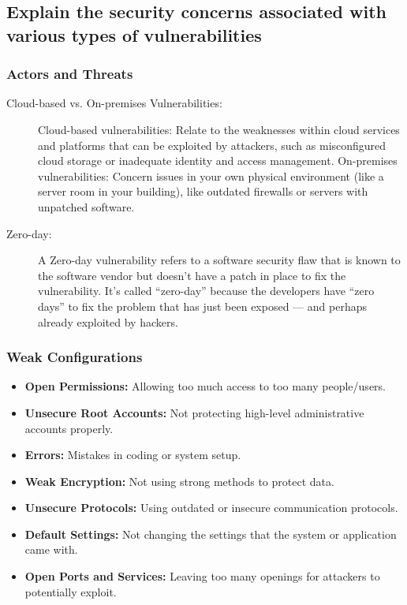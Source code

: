 \begin{fullwidth} 
    \subsection{Explain the security concerns associated with various types of vulnerabilities}
    \subsubsection*{\color{red}Actors and Threats}
    \begin{description}
        \item[Cloud-based vs. On-premises Vulnerabilities:] Cloud-based vulnerabilities: Relate to the weaknesses within cloud services and platforms that can be exploited by attackers, such as misconfigured cloud storage or inadequate identity and access management. On-premises vulnerabilities: Concern issues in your own physical environment (like a server room in your building), like outdated firewalls or servers with unpatched software.
        \item[Zero-day:] A Zero-day vulnerability refers to a software security flaw that is known to the software vendor but doesn’t have a patch in place to fix the vulnerability. It’s called “zero-day” because the developers have “zero days” to fix the problem that has just been exposed — and perhaps already exploited by hackers.
    \end{description}
    \subsubsection*{\color{red}Weak Configurations}
    \begin{itemize}
        \item \textbf{Open Permissions:} Allowing too much access to too many people/users.
        \item \textbf{Unsecure Root Accounts:} Not protecting high-level administrative accounts properly.
        \item \textbf{Errors:} Mistakes in coding or system setup.
        \item \textbf{Weak Encryption:} Not using strong methods to protect data.
        \item \textbf{Unsecure Protocols:} Using outdated or insecure communication protocols.
        \item \textbf{Default Settings:} Not changing the settings that the system or application came with.
        \item \textbf{Open Ports and Services:} Leaving too many openings for attackers to potentially exploit.
    \end{itemize}


\end{fullwidth}
